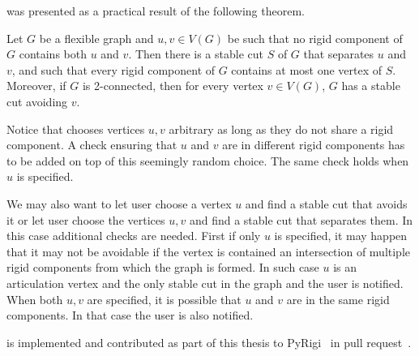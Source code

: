 was presented as a practical result of the following theorem.
%
\begin{theorem}
	Let \( G \) be a flexible graph and \( u, v \in V (G) \) be such that no rigid component of \( G \)
	contains both \( u \) and \( v \). Then there is a stable cut \( S \) of \( G \) that separates \( u \) and \( v \), and such that
	every rigid component of \( G \) contains at most one vertex of \( S \). Moreover, if \( G \) is 2-connected,
	then for every vertex \( v \in V(G) \), \( G \) has a stable cut avoiding \( v \).
\end{theorem}
%
Notice that 
chooses vertices \( u, v \) arbitrary as long as they do not share a rigid component.
A check ensuring that \( u \) and \( v \) are in different rigid components
has to be added on top of this seemingly random choice.
The same check holds when \( u \) is specified.

We may also want to let user choose a vertex \( u \) and find a stable cut
that avoids it or
let user choose the vertices \( u, v \) and find a stable cut
that separates them.
In this case additional checks are needed. First if only \( u \) is specified,
it may happen that it may not be avoidable if the vertex is contained
an intersection of multiple rigid components from which the graph is formed.
In such case \( u \) is an articulation vertex and the only stable cut in the graph
and the user is notified.
When both \( u, v \) are specified,
it is possible that \( u \) and \( v \) are in the same rigid components.
In that case the user is also notified.

%
is implemented and contributed as part of this thesis
to PyRigi~\cite{pyrigi} in pull request~\cite{pyrigi_pr_stable_cuts}.

